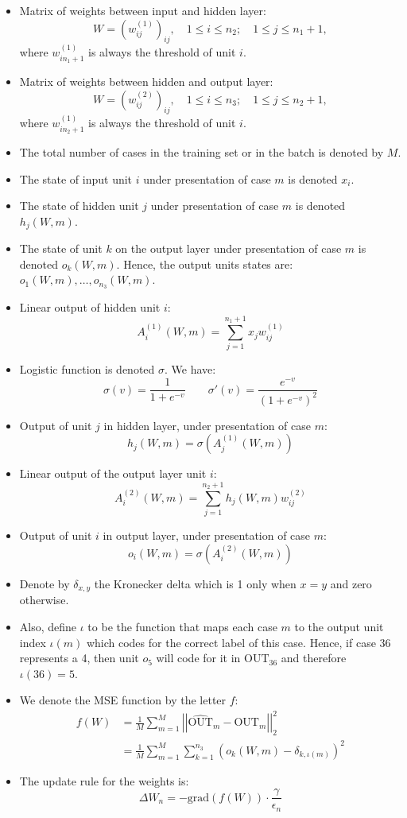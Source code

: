 \documentclass{article}
\newcommand{\lp}{\left(}
\newcommand{\rp}{\right)}
\begin{document}
\begin{itemize}
\item Matrix of weights between input and hidden layer:
\[
W=\left(w_{ij}^{(1)}\right)_{ij}, \quad 1\leq i\leq n_2; \quad1\leq j \leq n_1+1,
\]
where $w_{in_1+1}^{(1)}$ is always the threshold of unit $i$.
\item Matrix of weights between hidden and output layer:
\[
W=\left(w_{ij}^{(2)}\right)_{ij}, \quad 1\leq i\leq n_3; \quad1\leq j \leq n_2+1,
\]
where $w_{in_2+1}^{(1)}$ is always the threshold of unit $i$.
\item The total number of cases in the training set or in the batch is denoted by $M$.
\item The state of input unit $i$ under presentation of case $m$ is denoted $x_i$. 
\item The state of hidden unit $j$ under presentation of case $m$ is denoted $h_j(W,m)$.
\item The state of unit $k$ on the output layer under presentation of case $m$ is denoted $o_k(W,m)$.
Hence, the output units states are: $o_1(W,m),\ldots,o_{n_3}(W,m)$.
\item Linear output of hidden unit $i$:
\[
A_i^{(1)}(W,m)=\sum_{j=1}^{n_1+1}x_jw_{ij}^{(1)}
\]
\item Logistic function is denoted $\sigma$. We have:
\[
\sigma(v)=\frac{1}{1+e^{-v}}\qquad \sigma'(v)=\frac{e^{-v}}{\lp1+e^{-v}\rp^2}
\]
\item Output of unit $j$ in hidden layer, under presentation of case $m$:
\[
h_j(W,m)=\sigma\lp A_j^{(1)}(W,m) \rp
\]
\item Linear output of the output layer unit $i$:
\[
A_i^{(2)}(W,m)=\sum_{j=1}^{n_2+1}h_j(W,m)w_{ij}^{(2)}
\]
\item Output of unit $i$ in output layer, under presentation of case $m$:
\[
o_i(W,m)=\sigma\lp A_i^{(2)}(W,m) \rp
\]
\item Denote by $\delta_{x,y}$ the Kronecker delta which is 1 only when $x=y$ and zero otherwise.
\item Also, define $\iota$ to be the function that maps each case $m$ to the output unit index $\iota(m)$
which codes for the correct label of this case. Hence, if case 36 represents a 4, then unit $o_5$ will code
for it in $\text{OUT}_{36}$ and therefore $\iota(36)=5$.
\item We denote the MSE function by the letter $f$:
\begin{align}
f(W)&=\frac{1}{M}\sum_{m=1}^{M}\left |\left| \widehat{\text{OUT}}_m-\text{OUT}_m \right |\right |_2^2\\
	&=\frac{1}{M}\sum_{m=1}^M \sum_{k=1}^{n_3}\lp o_{k}(W,m)-\delta_{k,\iota(m)}\rp^2
\end{align}
\item The update rule for the weights is:
\[
\Delta W_n=-\text{grad} \lp f(W)\rp\cdot \frac{\gamma}{\epsilon_n}
\]
\end{itemize}
\end{document}
